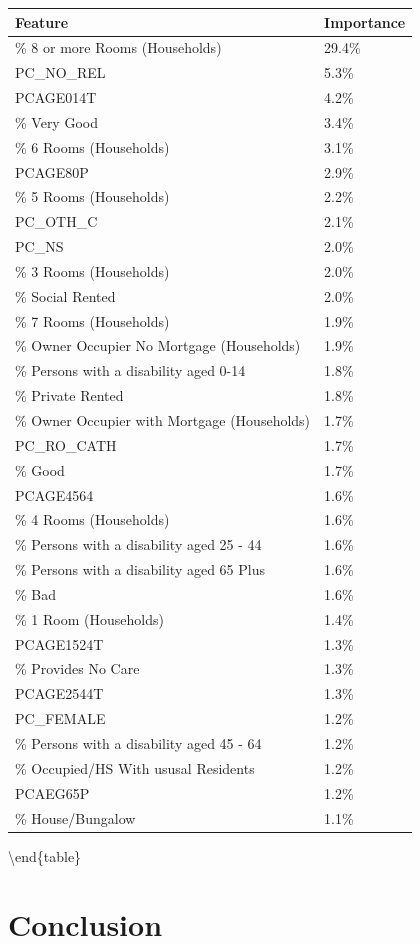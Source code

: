 \documentclass[]{elsarticle} %
\begin{document}
\begin{tabular}{ll}
\toprule
Feature & Importance\\
\midrule
\% 8 or more Rooms (Households) & 29.4\%\\
PC\_NO\_REL & 5.3\%\\
PCAGE014T & 4.2\%\\
\% Very Good & 3.4\%\\
\% 6 Rooms (Households) & 3.1\%\\
PCAGE80P & 2.9\%\\
\% 5 Rooms (Households) & 2.2\%\\
PC\_OTH\_C & 2.1\%\\
PC\_NS & 2.0\%\\
\% 3 Rooms (Households) & 2.0\%\\
\% Social Rented & 2.0\%\\
\% 7 Rooms (Households) & 1.9\%\\
\% Owner Occupier No Mortgage (Households) & 1.9\%\\
\% Persons with a disability aged 0-14 & 1.8\%\\
\% Private Rented & 1.8\%\\
\% Owner Occupier with Mortgage (Households) & 1.7\%\\
PC\_RO\_CATH & 1.7\%\\
\% Good & 1.7\%\\
PCAGE4564 & 1.6\%\\
\% 4 Rooms (Households) & 1.6\%\\
\% Persons with a disability aged 25 - 44 & 1.6\%\\
\% Persons with a disability aged 65 Plus & 1.6\%\\
\% Bad & 1.6\%\\
\% 1 Room (Households) & 1.4\%\\
PCAGE1524T & 1.3\%\\
\% Provides No Care & 1.3\%\\
PCAGE2544T & 1.3\%\\
PC\_FEMALE & 1.2\%\\
\% Persons with a disability aged 45 - 64 & 1.2\%\\
\% Occupied/HS With ususal Residents & 1.2\%\\
PCAEG65P & 1.2\%\\
\% House/Bungalow & 1.1\%\\
\bottomrule
\end{tabular}

\textbackslash{}end\{table\}

\section{Conclusion}\label{conclusion}
\end{document}
